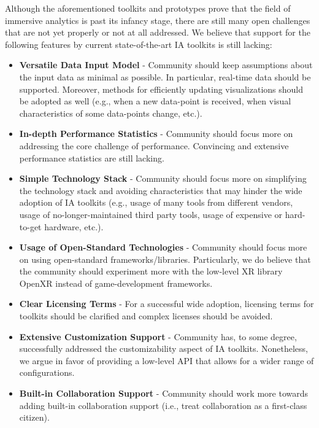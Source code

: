 \documentclass{vgtc}                          %
\begin{document}
\noindent Although the aforementioned toolkits and prototypes prove that the
field of immersive analytics is past its infancy stage, there are still many
open challenges that are not yet properly or not at all addressed. We believe
that support for the following features by current state-of-the-art IA toolkits
is still lacking:

\begin{itemize}
	\item \textbf{Versatile Data Input Model} - Community should keep
	      assumptions about the input data as minimal as possible. In
	      particular, real-time data should be supported. Moreover, methods for
	      efficiently updating visualizations should be adopted as well (e.g.,
	      when a new data-point is received, when visual characteristics of some
	      data-points change, etc.).
	\item \textbf{In-depth Performance Statistics} - Community should focus
	      more on addressing the core challenge of performance. Convincing and extensive
	      performance statistics are still lacking.
	\item \textbf{Simple Technology Stack} - Community should focus more on
	      simplifying the technology stack and avoiding characteristics that
	      may hinder the wide adoption of IA toolkits (e.g., usage of many
	      tools from different vendors, usage of no-longer-maintained third
	      party tools, usage of expensive or hard-to-get hardware, etc.).
	\item \textbf{Usage of Open-Standard Technologies} - Community should focus more on
	      using open-standard frameworks/libraries. Particularly, we do believe 
	      that the community should experiment more with the low-level XR library
	      OpenXR instead of game-development frameworks.
	\item \textbf{Clear Licensing Terms} - For a successful wide adoption,
	      licensing terms for toolkits should be clarified and complex licenses
	      should be avoided.
	\item \textbf{Extensive Customization Support} - Community has, to some degree,
	      successfully addressed the customizability aspect of IA toolkits.
	      Nonetheless, we argue in favor of providing a low-level API that
	      allows for a wider range of configurations.
	\item \textbf{Built-in Collaboration Support} - Community should work more towards
	      adding built-in collaboration support (i.e., treat collaboration as a first-class citizen).

\end{itemize}
\end{document}
